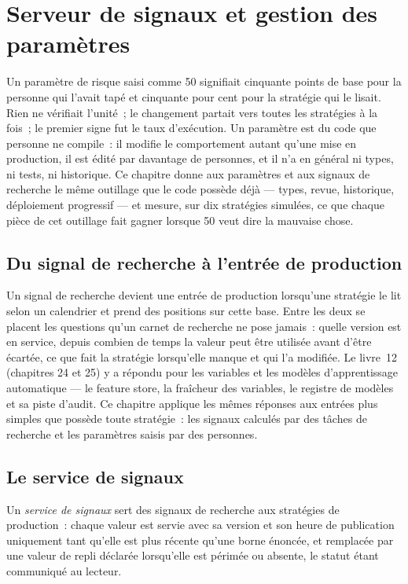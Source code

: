 \chapter{Serveur de signaux et gestion des paramètres}\label{ch:pl:signal-serving-and-parameter-management}

Un paramètre de risque saisi comme 50 signifiait cinquante points de base pour la personne qui l'avait tapé et cinquante pour cent pour la stratégie qui le lisait. Rien
ne vérifiait l'unité~; le changement partait vers toutes les stratégies à la fois~; le premier signe fut le taux d'exécution. Un paramètre est du code que personne ne compile~:
il modifie le comportement autant qu'une mise en production, il est édité par davantage de personnes, et il n'a en général ni types, ni tests, ni historique. Ce
chapitre donne aux paramètres et aux signaux de recherche le même outillage que le code possède déjà --- types, revue, historique, déploiement progressif --- et mesure,
sur dix stratégies simulées, ce que chaque pièce de cet outillage fait gagner lorsque 50 veut dire la mauvaise chose.

\section{Du signal de recherche à l'entrée de production}

Un signal de recherche devient une entrée de production lorsqu'une stratégie le lit selon un calendrier et prend des positions sur cette base. Entre les deux se placent les questions
qu'un carnet de recherche ne pose jamais~: quelle version est en service, depuis combien de temps la valeur peut être utilisée avant d'être écartée, ce que fait la stratégie lorsqu'elle manque
et qui l'a modifiée. Le livre~12 (chapitres 24 et 25) y a répondu pour les variables et les modèles d'apprentissage automatique --- le feature store,
la fraîcheur des variables, le registre de modèles et sa piste d'audit. Ce chapitre applique les mêmes réponses aux entrées plus simples que possède toute stratégie~:
les signaux calculés par des tâches de recherche et les paramètres saisis par des personnes.

\section{Le service de signaux}

\begin{definition}\label{def:pl:signal-serving-and-parameter-management:service}
Un \emph{service de signaux} sert des signaux de recherche aux stratégies de production~: chaque valeur est servie avec sa version et son heure de publication
uniquement tant qu'elle est plus récente qu'une borne énoncée, et remplacée par une valeur de repli déclarée lorsqu'elle est périmée ou absente, le statut
étant communiqué au lecteur.
\end{definition}


